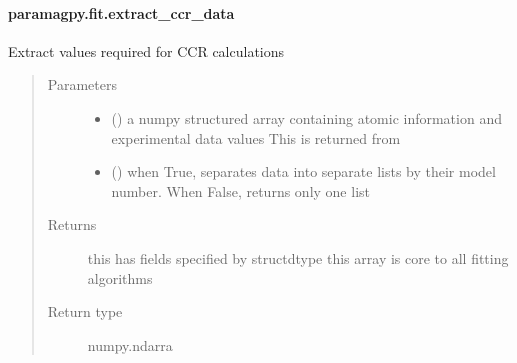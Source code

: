 \documentclass[a4paper,10pt,english,openany,oneside]{sphinxmanual}
\begin{document}
\paragraph{paramagpy.fit.extract\_ccr\_data}
\label{\detokenize{reference/generated/paramagpy.fit.extract_ccr_data:paramagpy-fit-extract-ccr-data}}\label{\detokenize{reference/generated/paramagpy.fit.extract_ccr_data::doc}}

\begin{fulllineitems}
\label{\detokenize{reference/generated/paramagpy.fit.extract_ccr_data:paramagpy.fit.extract_ccr_data}}
\sphinxAtStartPar
Extract values required for CCR calculations
\begin{quote}\begin{description}
\item[{Parameters}] \leavevmode\begin{itemize}
\item {} 
\sphinxAtStartPar
{} () \textendash{} a numpy structured array containing atomic information
and experimental data values
This is returned from
{\hyperref[\detokenize{reference/generated/paramagpy.protein.CustomStructure.parse:paramagpy.protein.CustomStructure.parse}]{}}

\item {} 
\sphinxAtStartPar
{} (\sphinxstyleliteralemphasis{\sphinxupquote{, }}) \textendash{} when True, separates data into separate lists
by their model number. When False, returns only one list

\end{itemize}

\item[{Returns}] \leavevmode
\sphinxAtStartPar
{} \textendash{} this has fields specified by structdtype
this array is core to all fitting algorithms

\item[{Return type}] \leavevmode
\sphinxAtStartPar
numpy.ndarra

\end{description}\end{quote}

\end{fulllineitems}
\end{document}
